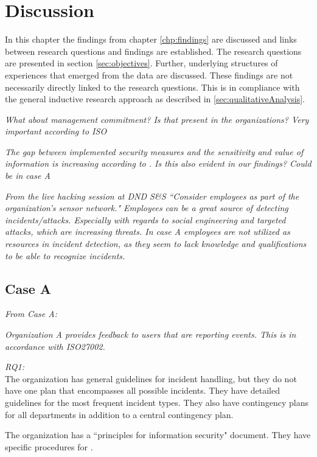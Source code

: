 \chapter{Discussion}
\label{chp:discussion}
In this chapter the findings from chapter \ref{chp:findings} are discussed and links between research questions and findings are established. The research questions are presented in section \ref{sec:objectives}. Further, underlying structures of experiences that emerged from the data are discussed. These findings are not necessarily directly linked to the research questions. This is in compliance with the general inductive research approach as described in \ref{sec:qualitativeAnalysis}.  



\textit{What about management commitment? Is that present in the organizations? Very important according to ISO}

\textit{The gap between implemented security measures and the sensitivity and value of information is increasing according to \cite{Morketall2012}. Is this also evident in our findings? Could be in case A}

\textit{From the live hacking session at DND S\&S ``Consider employees as part of the organization's sensor network." Employees can be a great source of detecting incidents/attacks. Especially with regards to social engineering and targeted attacks, which are increasing threats. In case A employees are not utilized as resources in incident detection, as they seem to lack knowledge and qualifications to be able to recognize incidents.}

\section{Case A}
\textit{From Case A:}

\textit{Organization A provides feedback to users that are reporting events. This is in accordance with ISO27002.}

\textit{RQ1:}\\
The organization has general guidelines for incident handling, but they do not have one plan that encompasses all possible incidents. They have detailed guidelines for the most frequent incident types. They also have contingency plans for all departments in addition to a central contingency plan. 

The organization has a ``principles for information security" document.
They have specific procedures for .

